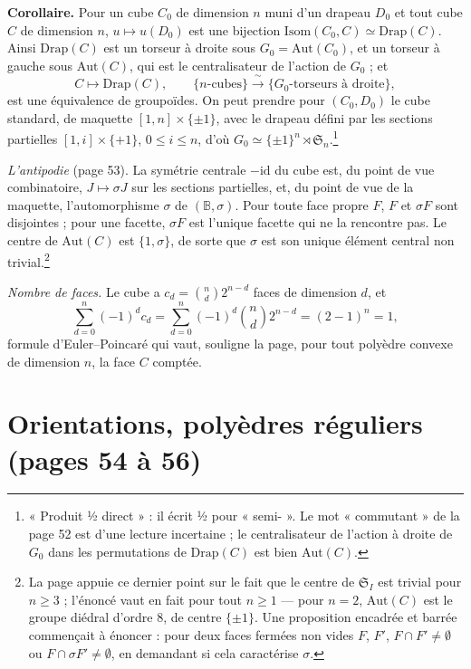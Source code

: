 \documentclass[11pt,a4paper]{article}
\begin{document}
\textbf{Corollaire.} Pour un cube $C_0$ de dimension $n$ muni d'un drapeau
$D_0$ et tout cube $C$ de dimension $n$, $u \mapsto u(D_0)$ est une bijection
$\mathrm{Isom}(C_0, C) \simeq \mathrm{Drap}(C)$. Ainsi $\mathrm{Drap}(C)$ est
un torseur à droite sous $G_0 = \mathrm{Aut}(C_0)$, et un torseur à gauche
sous $\mathrm{Aut}(C)$, qui est le centralisateur de l'action de $G_0$ ; et
\[
  C \longmapsto \mathrm{Drap}(C) , \qquad \{n\text{-cubes}\}
  \xrightarrow{\ \sim\ } \{G_0\text{-torseurs à droite}\} ,
\]
est une équivalence de groupoïdes. On peut prendre pour $(C_0, D_0)$ le cube
standard, de maquette $[1, n] \times \{\pm 1\}$, avec le drapeau défini par
les sections partielles $[1, i] \times \{+1\}$, $0 \leqslant i \leqslant n$,
d'où $G_0 \simeq \{\pm 1\}^n \rtimes \mathfrak{S}_n$.\footnote{« Produit ½
direct » : il écrit ½ pour « semi- ». Le mot « commutant » de la page 52 est
d'une lecture incertaine ; le centralisateur de l'action à droite de $G_0$
dans les permutations de $\mathrm{Drap}(C)$ est bien $\mathrm{Aut}(C)$.}

\emph{L'antipodie} (page 53). La symétrie centrale $-\mathrm{id}$ du cube
est, du point de vue combinatoire, $J \mapsto \sigma J$ sur les sections
partielles, et, du point de vue de la maquette, l'automorphisme $\sigma$ de
$(\mathbb{B}, \sigma)$. Pour toute face propre $F$, $F$ et $\sigma F$ sont
disjointes ; pour une facette, $\sigma F$ est l'unique facette qui ne la
rencontre pas. Le centre de $\mathrm{Aut}(C)$ est $\{1, \sigma\}$, de sorte
que $\sigma$ est son unique élément central non trivial.\footnote{La page
appuie ce dernier point sur le fait que le centre de $\mathfrak{S}_I$ est
trivial pour $n \geqslant 3$ ; l'énoncé vaut en fait pour tout $n \geqslant
1$ --- pour $n = 2$, $\mathrm{Aut}(C)$ est le groupe diédral d'ordre 8, de
centre $\{\pm 1\}$. Une proposition encadrée et barrée commençait à
énoncer : pour deux faces fermées non vides $F$, $F'$, $F \cap F' \neq
\emptyset$ ou $F \cap \sigma F' \neq \emptyset$, en demandant si cela
caractérise $\sigma$.}

\emph{Nombre de faces.} Le cube a $c_d = \binom{n}{d} 2^{n-d}$ faces de
dimension $d$, et
\[
  \sum_{d=0}^n (-1)^d c_d = \sum_{d=0}^n (-1)^d \binom{n}{d} 2^{n-d} = (2 -
  1)^n = 1 ,
\]
formule d'Euler--Poincaré qui vaut, souligne la page, pour tout polyèdre
convexe de dimension $n$, la face $C$ comptée.

\section*{Orientations, polyèdres réguliers (pages 54 à 56)}
\end{document}
